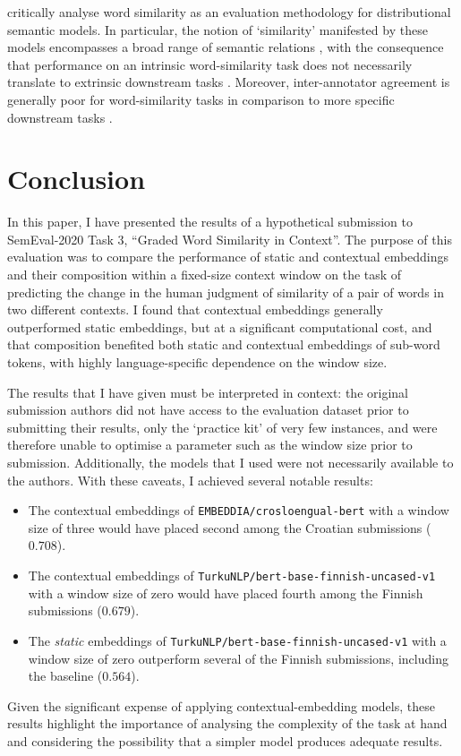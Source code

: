 \textcite{Batchkarov2016} critically analyse word similarity as an evaluation
methodology for distributional semantic models.
In particular, the notion of `similarity' manifested by these models encompasses a
broad range of semantic relations \parencite[e.g.,][2]{Pado2003}, with the consequence
that performance on an intrinsic word-similarity task does not necessarily translate
to extrinsic downstream tasks \parencite[7-8]{Batchkarov2016}.
Moreover, inter-annotator agreement is generally poor for word-similarity tasks in
comparison to more specific downstream tasks \parencite[8-9]{Batchkarov2016}.

\section{Conclusion}

In this paper, I have presented the results of a hypothetical submission to SemEval-2020
Task 3, ``Graded Word Similarity in Context''.
The purpose of this evaluation was to compare the performance of static and contextual
embeddings and their composition within a fixed-size context window on the task of
predicting the change in the human judgment of similarity of a pair of words in two
different contexts.
I found that contextual embeddings generally outperformed static embeddings, but at a
significant computational cost, and that composition benefited both static and
contextual embeddings of sub-word tokens, with highly language-specific dependence
on the window size.

The results that I have given must be interpreted in context: the original submission
authors did not have access to the evaluation dataset prior to submitting their results,
only the `practice kit' of very few instances, and were therefore unable to optimise a
parameter such as the window size prior to submission.
Additionally, the models that I used were not necessarily available to the authors.
With these caveats, I achieved several notable results:
\begin{itemize}
  \item The contextual embeddings of \texttt{EMBEDDIA/crosloengual-bert} with a window
        size of three would have placed second among the Croatian submissions
        ($0.708$).
  \item The contextual embeddings of \texttt{TurkuNLP/bert-base-finnish-uncased-v1} with
        a window size of zero would have placed fourth among the Finnish submissions
        ($0.679$).
  \item The \emph{static} embeddings of \texttt{TurkuNLP/bert-base-finnish-uncased-v1}
        with a window size of zero outperform several of the Finnish submissions,
        including the baseline ($0.564$).
\end{itemize}
Given the significant expense of applying contextual-embedding models, these results
highlight the importance of analysing the complexity of the task at hand and considering
the possibility that a simpler model produces adequate results.